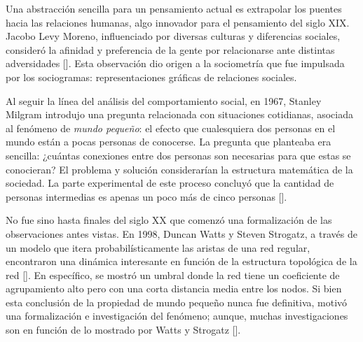 \documentclass[../main.tex]{subfiles}
\begin{document}






Una abstracción sencilla para un pensamiento actual es extrapolar los puentes hacia las relaciones humanas, algo innovador para el pensamiento del siglo XIX. Jacobo Levy Moreno, influenciado por diversas culturas y diferencias sociales, consideró la afinidad y preferencia de la gente por relacionarse ante distintas adversidades [\cite{moreno_intro}]. Esta observación dio origen a la sociometría que fue impulsada por los sociogramas: representaciones gráficas de relaciones sociales.


%
Al seguir la línea del análisis del comportamiento social, en 1967,  Stanley Milgram introdujo una pregunta relacionada con situaciones cotidianas, asociada al fenómeno de \textit{mundo pequeño}: el efecto que cualesquiera dos personas en el mundo están a pocas personas de conocerse. La pregunta que planteaba era sencilla: ¿cuántas conexiones entre dos personas son necesarias para que estas se conocieran? El problema y solución considerarían la estructura matemática de la sociedad. La parte experimental de este proceso concluyó que la cantidad de personas intermedias es apenas un poco más de cinco personas [\cite{milgram1967small}]. 


No fue sino hasta finales del siglo XX que comenzó una formalización de las observaciones antes vistas. En 1998, Duncan Watts  y  Steven Strogatz, a través de un modelo que itera probabilísticamente las aristas de una red regular, encontraron una dinámica interesante en función de la estructura topológica de la red [\cite{Watts1998}]. En específico, se mostró un umbral donde la red tiene un coeficiente de agrupamiento alto pero con una corta distancia media entre los nodos.  Si bien esta conclusión de la propiedad de mundo pequeño nunca fue definitiva, motivó una formalización e investigación del fenómeno; aunque, muchas investigaciones son en función de lo mostrado por Watts y Strogatz [\cite{Telesford2011}].  
\end{document}
